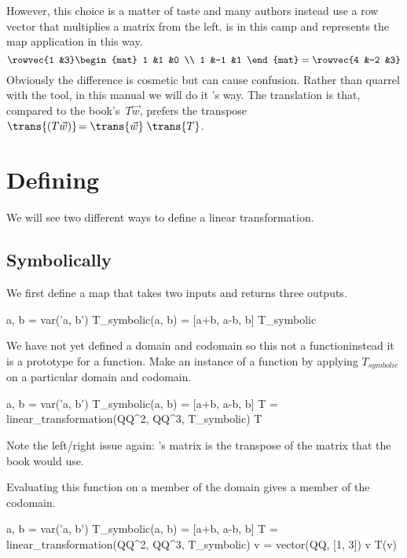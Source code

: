 However, this choice is a matter of taste and many authors instead
use a row vector that multiplies a matrix from the left.
\Sage{} is in this camp and
represents the map application in this way.
\begin{equation*}
  \rowvec{1 &3}
  \begin{mat}
    1 &1  &0 \\
    1 &-1 &1
  \end{mat}
  =
  \rowvec{4 &-2 &3}
\end{equation*}
Obviously the difference is cosmetic but can cause confusion.
Rather than quarrel with the tool, in this manual we will do it
\Sage's way.
The translation is that, compared to the book's~$T\vec{w}$,
\Sage{} prefers the 
transpose~$\trans{(T\vec{w})}\!=\trans{\vec{w}}\;\trans{T}$.



  

\section{Defining}
We will see two different ways to define a linear transformation.

\subsection{Symbolically}
We first define a map that takes two inputs and returns three outputs.
\begin{sageoutput}
a, b = var('a, b')   
T_symbolic(a, b) = [a+b, a-b, b]         
T_symbolic       
\end{sageoutput}
We have not yet defined a domain and codomain 
so this not a function\Dash instead it is a prototype for a function.
Make an instance of a function by applying $T_{\textit{symbolic}}$ on a 
particular domain and codomain.  %
\begin{sageoutput}[d,0,2] 
a, b = var('a, b')   
T_symbolic(a, b) = [a+b, a-b, b]         
T = linear_transformation(QQ^2, QQ^3, T_symbolic)
T                                              
\end{sageoutput}
\noindent Note the left/right issue again: \Sage's matrix is the transpose of
the matrix that the book would use.

Evaluating this function on a member of the domain gives a member
of the codomain. 
\begin{sageoutput}[d,0,3]
a, b = var('a, b')   
T_symbolic(a, b) = [a+b, a-b, b]         
T = linear_transformation(QQ^2, QQ^3, T_symbolic)
v = vector(QQ, [1, 3])  
v
T(v)
\end{sageoutput}

